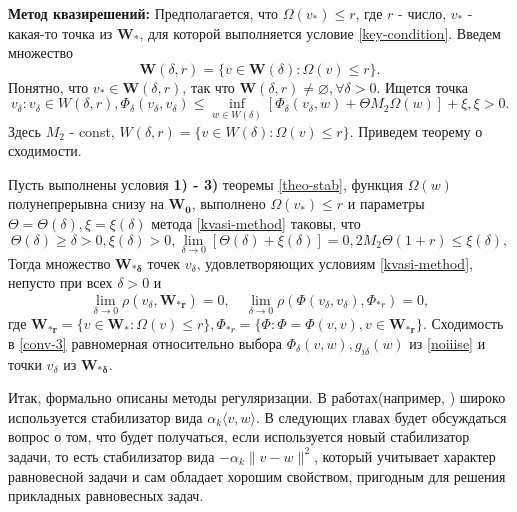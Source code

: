 \textbf{Метод квазирешений:} Предполагается, что $\Omega(v_*)\leqslant r$, где $r$ - число, $v_*$ - какая-то точка из $\mathbf{W_*}$, для которой выполняется условие \eqref{key-condition}. Введем множество
\begin{equation*}
\mathbf{W}(\delta,r)=\{ v\in\mathbf{W}(\delta):\Omega(v)\leqslant r \}.
\end{equation*}
Понятно, что $v_*\in \mathbf{W}(\delta,r)$, так что $\mathbf{W}(\delta,r)\ne \varnothing,\forall \delta >0$. Ищется точка
\begin{equation}
\label{kvasi-method}
 v_{\delta}: v_{\delta}\in W(\delta,r),\Phi_{\delta}(v_{\delta},v_{\delta})\leqslant\inf\limits_{w\in W(\delta)}[\Phi_{\delta}(v_{\delta},w)+\Theta M_2\Omega(w)]+\xi,\xi>0.
\end{equation}
Здесь $M_2$ - const, $W(\delta,r)=\{v\in W(\delta):\Omega(v)\leqslant r \}$. Приведем теорему о сходимости.
\begin{theo}
Пусть выполнены условия \textbf{1) - 3)} теоремы \ref{theo-stab}, функция $\Omega(w)$ полунепрерывна снизу на $\mathbf{W_0}$, выполнено $\Omega(v_*)\leqslant r$ и параметры $\Theta=\Theta(\delta),\xi=\xi(\delta)$ метода \eqref{kvasi-method} таковы, что
\begin{equation*}
\Theta(\delta)\geqslant \delta >0,\xi(\delta)>0,\lim\limits_{\delta\to 0}[\Theta(\delta)+\xi(\delta)]=0,2M_2\Theta(1+r)\leqslant\xi(\delta),
\end{equation*}
Тогда множество $\mathbf{W_{*\delta}}$ точек $v_{\delta}$, удовлетворяющих условиям \eqref{kvasi-method}, непусто при всех $\delta>0 $ и 
\begin{equation}
\label{conv-3}
\lim_{\delta\rightarrow 0}\rho(v_{\delta},\mathbf{W_{*r}})=0,\quad\lim_{\delta\rightarrow 0} \rho(\Phi(v_{\delta},v_{\delta}),\Phi_{*r})=0,
\end{equation}
где $\mathbf{W_{*r}}=\{v\in \mathbf{W_*} : \Omega(v)\leqslant r\},\Phi_{*r}=\{\Phi:\Phi=\Phi(v,v),v\in\mathbf{W_{*r}} \}$. Сходимость в \eqref{conv-3} равномерная относительно выбора $\Phi_{\delta}(v,w),g_{i\delta}(w)$ из \eqref{noiiise} и точки $v_{\delta}$ из $\mathbf{W_{*\delta}}$.
\end{theo}

Итак, формально описаны методы регуляризации. В работах(например, \cite{centralbib}\cite{centralbib-2}\cite{15}) широко используется стабилизатор вида $\alpha_k\langle v,w\rangle$. В следующих главах будет обсуждаться вопрос о том, что будет получаться, если используется новый стабилизатор задачи, то есть стабилизатор вида $-\alpha_k\|v-w\|^2$, который учитывает характер равновесной задачи и сам обладает хорошим свойством, пригодным для решения прикладных равновесных задач.
\clearpage
